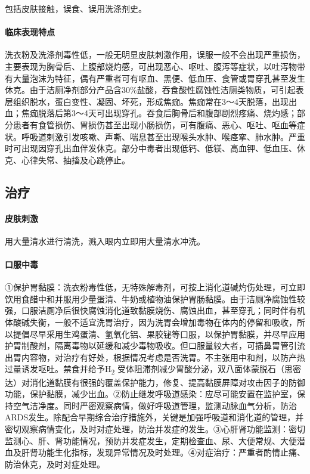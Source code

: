包括皮肤接触，误食、误用洗涤剂史。

\paragraph{临床表现特点}

洗衣粉及洗涤剂毒性低，一般无明显皮肤刺激作用，误服一般不会出现严重损伤，主要表现为胸骨后、上腹部烧灼感，可出现恶心、呕吐、腹泻等症状，以吐泻物带有大量泡沫为特征，偶有严重者可有呕血、黑便、低血压、食管或胃穿孔甚至发生休克。由于洁厕净剂部分产品含30\%盐酸，吞食酸性腐蚀性洁厕类物质，可引起表层组织脱水，蛋白变性、凝固、坏死，形成焦痂。焦痂常在3～4天脱落，出现出血；焦痂脱落后第3～4天可出现穿孔。吞食后胸骨后和腹部剧烈疼痛、烧灼感；部分患者有食管损伤、胃损伤甚至出现小肠损伤，可有腹痛、恶心、呕吐、呕血等症状。呼吸道刺激引发咳嗽、声嘶、喘息甚至出现喉头水肿、喉痉挛、肺水肿。严重时可出现因穿孔出血伴发休克。部分中毒者出现低钙、低镁、高血钾、低血压、休克、心律失常、抽搐及心跳停止。

\subsection{治疗}

\paragraph{皮肤刺激}

用大量清水进行清洗，溅入眼内立即用大量清水冲洗。

\paragraph{口服中毒}

①保护胃黏膜：洗衣粉毒性低，无特殊解毒剂，可按上消化道碱灼伤处理，可立即饮用食醋中和并服用少量蛋清、牛奶或植物油保护胃肠黏膜。由于洁厕净腐蚀性较强，口服洁厕净后很快腐蚀消化道致黏膜烧伤、腐蚀出血，甚至穿孔；同时伴有机体酸碱失衡，一般不适宜洗胃治疗，因为洗胃会增加毒物在体内的停留和吸收，所以提倡尽早采用生鸡蛋清、氢氧化铝、果胶铋等口服，以保护胃黏膜，并尽早应用护胃制酸剂，隔离毒物以延缓和减少毒物吸收。但口服量较大者，可插鼻胃管引流出胃内容物，对治疗有好处，根据情况考虑是否洗胃。不主张用中和剂，以防产热过量诱发呕吐。禁食并给予H\textsubscript{2}
受体阻滞剂减少胃酸分泌，双八面体蒙脱石（思密达）对消化道黏膜有很强的覆盖保护能力，修复、提高黏膜屏障对攻击因子的防御功能，保护黏膜，减少出血。②防止继发呼吸道感染：应尽可能安置在监护室，保持空气洁净度。同时严密观察病情，做好呼吸道管理，监测动脉血气分析，防治ARDS发生。除配合早期综合治疗措施外，关键是加强呼吸道和消化道的管理，并密切观察病情变化，及时对症处理，防治并发症的发生。③心肝肾功能监测：密切监测心、肝、肾功能情况，预防并发症发生，定期检查血、尿、大便常规、大便潜血及肝肾功能生化指标，发现异常情况及时处理。④对症治疗：严重者酌情止痛、防治休克，及时对症处理。

